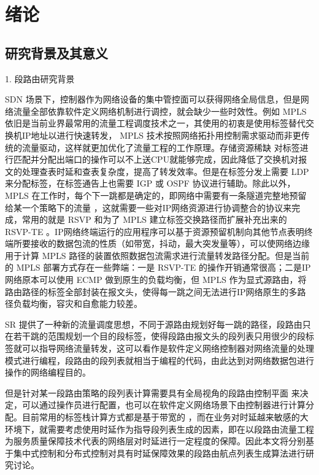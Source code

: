 
\chapter{绪论}
\section{研究背景及其意义}

1. 段路由研究背景

\gls*{SDN} \cite{OPENFLOW, SDN} 场景下，控制器作为网络设备的集中管控面可以获得网络全局信息，但是网络流量全部依靠软件定义网络机制进行调控，就会缺少一些时效性。例如 \gls*{MPLS} 依旧是当前业界最常用的流量工程调度技术之一，其使用的初衷是使用标签替代交换机IP地址以进行快速转发， \gls*{MPLS} \cite{MPLS} 技术按照网络拓扑用控制需求驱动而非更传统的流量驱动，这样就更加优化了流量工程的工作原理。存储资源稀缺 \cite{TCAMMPLS, TCAMSDN} 对标签进行匹配并分配出端口的操作可以不上送CPU就能够完成，因此降低了交换机对报文的处理查表时延和查表复杂度，提高了转发效率。但是在标签分发上需要 \gls*{LDP} 来分配标签，在标签通告上也需要 \gls*{IGP} 或 \gls*{OSPF} 协议进行辅助。除此以外， \gls*{MPLS} 在工作时，每个下一跳都是确定的，即网络中需要有一条隧道完整地预留给某一个策略下的流量 \cite{MPLS} ，这就需要一些对IP网络资源进行协调整合的协议来完成，常用的就是 \gls*{RSVP} \cite{RSVP} 和为了 \gls*{MPLS} 建立标签交换路径而扩展补充出来的 \gls*{RSVP-TE} 。IP网络终端运行的应用程序可以基于资源预留机制向其他节点表明终端所要接收的数据包流的性质（如带宽，抖动，最大突发量等），可以使网络边缘用于计算 \gls*{MPLS} 路径的装置依照数据包流需求进行流量转发路径分配。但是当前的 \gls*{MPLS} 部署方式存在一些弊端：一是 \gls*{RSVP-TE} 的操作开销通常很高；二是IP网络原本可以使用 \gls*{ECMP} 做到原生的负载均衡，但 \gls*{MPLS} 作为显式源路由，将路由路径的标签全部封装在报文头，使得每一跳之间无法进行IP网络原生的多路径负载均衡，容灾和自愈能力较差。

\gls*{SR} \cite*{SRARK} 提供了一种新的流量调度思想，不同于源路由规划好每一跳的路径，段路由只在若干跳的范围规划一个目的段标签，使得段路由报文头的段列表只用很少的段标签就可以指导网络流量转发，这可以看作是软件定义网络控制器对网络流量的处理模式进行编程，段路由的段列表就相当于编程的代码，由此达到对网络数据包进行操作的网络编程目的。

但是针对某一段路由策略的段列表计算需要具有全局视角的段路由控制平面 \cite{SRARK} 来决定，可以通过操作员进行配置，也可以在软件定义网络场景下由控制器进行计算分配。目前常用的标签栈计算方式都是基于带宽的 \cite{SIDLENGTHPROVE, SIDLENGTHANALYSIS, SRQOE, SRMULTIPATH, SRLABELSTACK, SRNODETE, SRBANDWIDTH1, SRBANDWIDTH2, SRBANDWIDTH3, SRBANDWIDTH4, SRBANDWIDTH5, SRBANDWIDTH6, SRBANDWIDTH7, SRBANDWIDTH8, SRBANDWIDTH9, SRBANDWIDTH11, SRBANDWIDTH12}，而在业务对时延越来敏感的大环境下，就需要考虑使用时延作为指导段列表生成的因素，即在以段路由流量工程为服务质量保障技术代表的网络层对时延进行一定程度的保障。因此本文将分别基于集中式控制和分布式控制对具有时延保障效果的段路由航点列表生成算法进行研究讨论。

